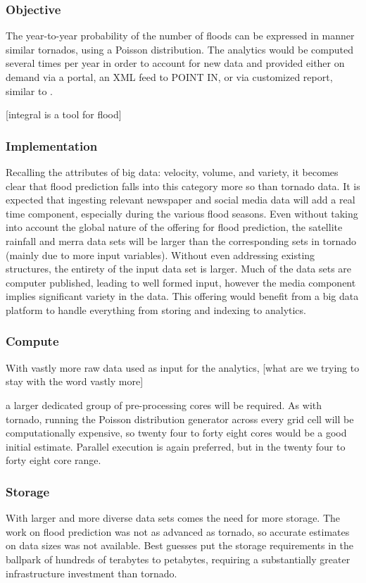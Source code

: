 \subsubsection{Objective}
The year-to-year probability of the number of floods can be expressed in manner similar tornados, using a Poisson distribution. The analytics would be computed several times per year in order to account for new data and provided either on demand via a portal, an XML feed to POINT IN, or via customized  report, similar to \climatedge.

[integral is a tool for flood]


\subsubsection{Implementation}
Recalling the attributes of big data: velocity, volume, and variety, it becomes clear that flood prediction falls into this category more so than tornado data. It is expected that ingesting relevant newspaper and social media data will add a real time component, especially during the various flood seasons. Even without taking into account the global nature of the offering for flood prediction, the satellite rainfall and \gls{merra} data sets will be larger than the corresponding sets in tornado (mainly due to more input variables). Without even addressing existing structures, the entirety of the input data set is larger. Much of the data sets are computer published, leading to well formed input, however the media component implies significant variety in the data.  This offering would benefit from a big data platform to handle everything from storing and indexing to analytics.
\subsubsection{Compute}
 With vastly more raw data used as input for the analytics,
 [what are we trying to stay with the word vastly more]
 
  a larger dedicated group of pre-processing cores will be required. As with tornado, running the Poisson distribution generator across every grid cell will be computationally expensive, so twenty four to forty eight cores would be a good initial estimate. Parallel execution is again preferred, but in the twenty four to forty eight core range. 
\subsubsection{Storage}
With larger and more diverse data sets comes the need for more storage. The work on flood prediction was not as advanced as tornado, so accurate estimates on data sizes was not available. Best guesses put the storage requirements in the ballpark of hundreds of terabytes to petabytes, requiring a substantially greater infrastructure investment than tornado.